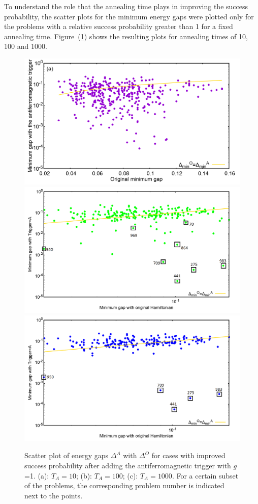 \documentclass[../main.tex]{subfiles}
\begin{document}
To understand the role that the annealing time plays in improving the success probability, the scatter plots for the minimum energy gaps were plotted only for the problems with a relative success probability greater than 1 for a fixed annealing time. Figure~(\ref{fig:a23}) shows the resulting plots for annealing times of 10, 100 and 1000.\\

\begin{figure}
\centering 
\includegraphics[scale=0.2]{selected_T10_g1.png}
\includegraphics[scale=0.33]{selected_T100_g1.png}
\includegraphics[scale=0.33]{selected_T1000_g1.png}
\caption{Scatter plot of energy gaps $\Delta^A $ with $\Delta^O$ for cases with improved success probability after adding the antiferromagnetic trigger with $g$=1. (a): $T_A=10$; (b): $T_A=100$; (c): $T_A=1000$. For a certain subset of the problems, the corresponding problem number is indicated next to the points.}
\label{fig:a23}
\end{figure}
\end{document}
